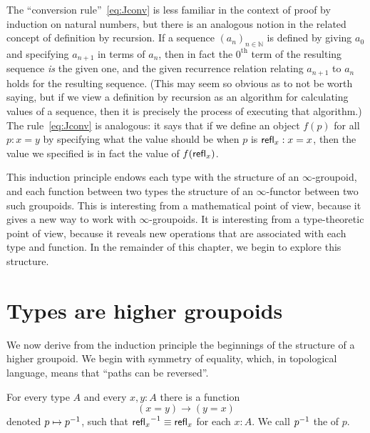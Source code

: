 The ``conversion rule''~\eqref{eq:Jconv} is less familiar in the context of proof by induction on natural numbers, but there is an analogous notion in the related concept of definition by recursion.
If a sequence $(a_n)_{n\in \mathbb{N}}$ is defined by giving $a_0$ and specifying $a_{n+1}$ in terms of $a_n$, then in fact the $0^{\mathrm{th}}$ term of the resulting sequence \emph{is} the given one, and the given recurrence relation relating $a_{n+1}$ to $a_n$ holds for the resulting sequence.
(This may seem so obvious as to not be worth saying, but if we view a definition by recursion as an algorithm for calculating values of a sequence, then it is precisely the process of executing that algorithm.)
The rule~\eqref{eq:Jconv} is analogous: it says that if we define an object $f(p)$ for all $p:x=y$ by specifying what the value should be when $p$ is $\mathsf{refl}_{x}:x=x$, then the value we specified is in fact the value of $f(\mathsf{refl}_{x})$.

This induction principle endows each type with the structure of an $\infty$-groupoid, and each function between two types the structure of an $\infty$-functor between two such groupoids.  This is interesting from a mathematical point of view, because it gives a new way to work with
$\infty$-groupoids.  It is interesting from a type-theoretic point of view, because it reveals new operations that are associated with each type and function.  In the remainder of this chapter, we begin to explore this structure.

\section{Types are higher groupoids}
\label{sec:equality}

%
%
%
We now derive from the induction principle the beginnings of the structure of a higher groupoid.
We begin with symmetry of equality, which, in topological language, means that ``paths can be reversed''.

\begin{lem}\label{lem:opp}
  For every type $A$ and every $x,y:A$ there is a function
  \begin{equation*}
    (x= y)\to(y= x)
  \end{equation*}
  denoted $p\mapsto \mathord{{p}^{-1}}$, such that $\mathord{{\mathsf{refl}_{x}}^{-1}}\equiv\mathsf{refl}_{x}$ for each $x:A$.
  We call $\mathord{{p}^{-1}}$ the  of $p$.
\end{lem}

